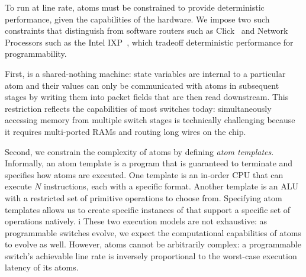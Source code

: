 To run at line rate, atoms must be constrained to
provide deterministic performance, given the capabilities of the hardware. We
impose two such constraints that distinguish \absmachine from software routers
such as Click~\cite{click} and Network Processors such as the Intel
IXP~\cite{ixp4xx}, which tradeoff deterministic performance for
programmability.

First, \absmachine is a shared-nothing machine: state variables are
internal to a particular atom and their values can only be
communicated with atoms in subsequent stages by writing them into
packet fields that are then read downstream.  This restriction
reflects the capabilities of most switches today: simultaneously
accessing memory from multiple switch stages is technically
challenging because it requires multi-ported RAMs and routing long
wires on the chip.

Second, we constrain the complexity of atoms by defining {\it atom templates}.
Informally, an atom template is a program that is guaranteed to terminate and
specifies how atoms are executed. One template is an in-order CPU that can
execute $N$ instructions, each with a specific format. Another template is an
ALU with a restricted set of primitive operations to choose from. Specifying
atom templates allows us to create specific instances of \absmachine that
support a specific set of operations natively.
i
These two execution models are not exhaustive: as programmable switches evolve,
we expect the computational capabilities of atoms to evolve as well. However,
atoms cannot be arbitrarily complex: a programmable switch's achievable line
rate is inversely proportional to the worst-case execution latency of its
atoms.
